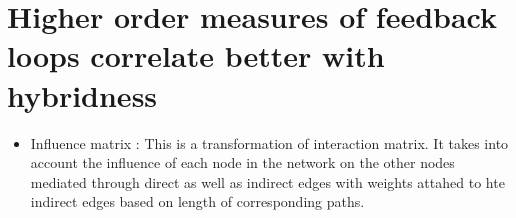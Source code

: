 \documentclass{article}
\begin{document}
\section{Higher order measures of feedback loops correlate better with hybridness}

\begin{itemize}

\item Influence matrix : This is a transformation of interaction matrix. It takes into account the influence of each node in the network on the other nodes mediated through direct as well as indirect edges with weights attahed to hte indirect edges based on length of corresponding paths.    
\end{itemize}
\end{document}
